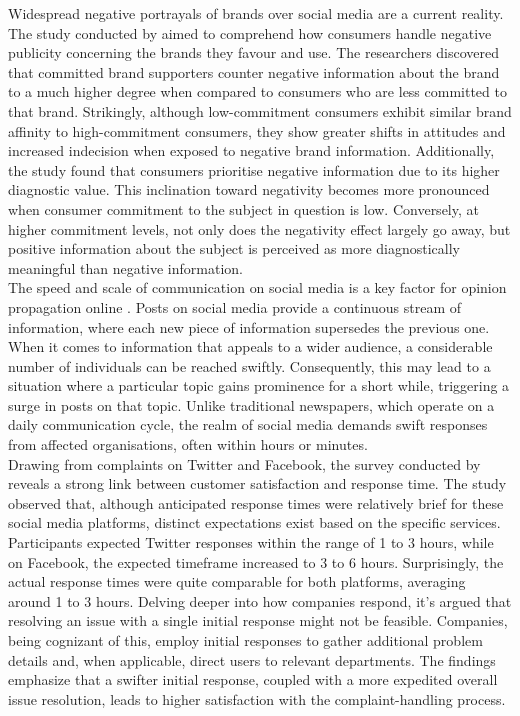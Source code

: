 Widespread negative portrayals of brands over social media are a current reality. The study conducted by \cite{ahluwaliaConsumerResponseNegative2000} aimed to comprehend how consumers handle negative publicity concerning the brands they favour and use. The researchers discovered that committed brand supporters counter negative information about the brand to a much higher degree when compared to consumers who are less committed to that brand. Strikingly, although low-commitment consumers exhibit similar brand affinity to high-commitment consumers, they show greater shifts in attitudes and increased indecision when exposed to negative brand information. Additionally, the study found that consumers prioritise negative information due to its higher diagnostic value. This inclination toward negativity becomes more pronounced when consumer commitment to the subject in question is low. Conversely, at higher commitment levels, not only does the negativity effect largely go away, but positive information about the subject is perceived as more diagnostically meaningful than negative information.\\

The speed and scale of communication on social media is a key factor for opinion propagation online \cite{pfefferUnderstandingOnlineFirestorms2014}. Posts on social media provide a continuous stream of information, where each new piece of information supersedes the previous one. When it comes to information that appeals to a wider audience, a considerable number of individuals can be reached swiftly. Consequently, this may lead to a situation where a particular topic gains prominence for a short while, triggering a surge in posts on that topic. Unlike traditional newspapers, which operate on a daily communication cycle, the realm of social media demands swift responses from affected organisations, often within hours or minutes.\\

Drawing from complaints on Twitter and Facebook, the survey conducted by \cite{istanbulluogluComplaintHandlingSocial2017} reveals a strong link between customer satisfaction and response time. The study observed that, although anticipated response times were relatively brief for these social media platforms, distinct expectations exist based on the specific services. Participants expected Twitter responses within the range of 1 to 3 hours, while on Facebook, the expected timeframe increased to 3 to 6 hours. Surprisingly, the actual response times were quite comparable for both platforms, averaging around 1 to 3 hours. Delving deeper into how companies respond, it's argued that resolving an issue with a single initial response might not be feasible. Companies, being cognizant of this, employ initial responses to gather additional problem details and, when applicable, direct users to relevant departments. The findings emphasize that a swifter initial response, coupled with a more expedited overall issue resolution, leads to higher satisfaction with the complaint-handling process.\\

